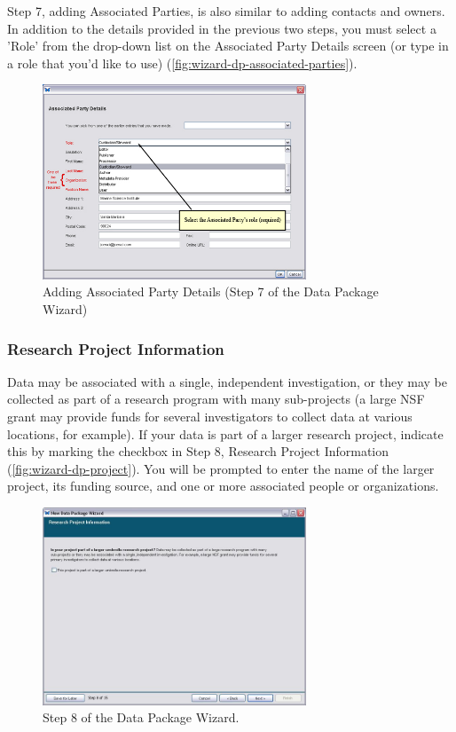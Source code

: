 Step 7, adding Associated Parties, is also similar to adding contacts
and owners. In addition to the details provided in the previous two
steps, you must select a 'Role' from the drop-down list on the
Associated Party Details screen (or type in a role that you'd like to
use) (\autoref{fig:wizard-dp-associated-parties}).

\begin{figure}
  \centering
    \includegraphics[width=0.7\textwidth]{images/wizard-dp-associated-parties.jpg}
  \caption{Adding Associated Party Details (Step 7 of the Data Package
    Wizard)}
  \label{fig:wizard-dp-associated-parties}
\end{figure}

\subsubsection{Research Project Information} \label{sec:wizard-dp-project}

Data may be associated with a single, independent investigation, or they
may be collected as part of a research program with many sub-projects (a
large NSF grant may provide funds for several investigators to collect
data at various locations, for example). If your data is part of a
larger research project, indicate this by marking the checkbox in Step
8, Research Project Information (\autoref{fig:wizard-dp-project}). You
will be prompted to enter the name of the larger project, its funding
source, and one or more associated people or organizations. 

\begin{figure}
  \centering
    \includegraphics[width=0.7\textwidth]{images/wizard-dp-project.jpg}
  \caption{Step 8 of the Data Package Wizard.}
  \label{fig:wizard-dp-project}
\end{figure}

